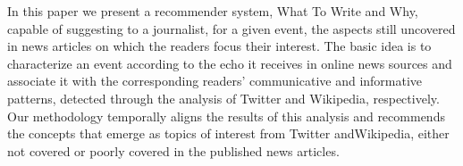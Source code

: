 In this paper we present a recommender system, What To Write and Why, capable of suggesting to a journalist, for a given event, the aspects still uncovered in news articles on which the readers focus their interest. The basic idea is to characterize an event according to the echo it receives in online news sources and associate it with the corresponding readers' communicative and informative patterns, detected through the analysis of Twitter and Wikipedia, respectively. Our methodology temporally aligns the results of this analysis and recommends the concepts that emerge as topics of interest from Twitter andWikipedia, either not covered or poorly covered in the published news articles.
